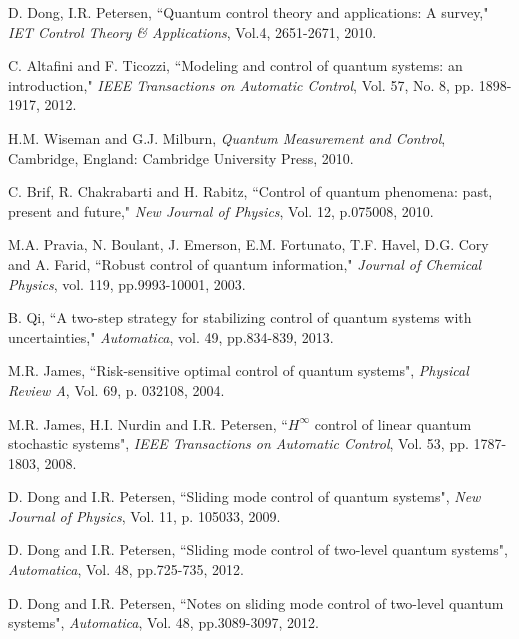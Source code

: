 \documentclass[letterpaper, 10 pt, conference]{ieeeconf}
\begin{document}
\begin{thebibliography}{99}


D. Dong, I.R. Petersen, ``Quantum control theory and
applications: A survey," {\em IET Control Theory \& Applications},
Vol.4, 2651-2671, 2010.

C. Altafini and F. Ticozzi, ``Modeling and control of quantum
systems: an introduction," {\em IEEE Transactions on Automatic
Control}, Vol. 57, No. 8, pp. 1898-1917, 2012.

H.M. Wiseman and G.J. Milburn, {\em Quantum Measurement and
Control}, Cambridge, England: Cambridge University Press, 2010.

C. Brif, R. Chakrabarti and H. Rabitz, ``Control of quantum
phenomena: past, present and future," {\em New Journal of Physics},
Vol. 12, p.075008, 2010.








M.A. Pravia, N. Boulant, J. Emerson, E.M. Fortunato, T.F. Havel,
D.G. Cory and A. Farid, ``Robust control of quantum information,"
{\em Journal of Chemical Physics}, vol. 119, pp.9993-10001, 2003.

B. Qi, ``A two-step strategy for stabilizing control of quantum systems with uncertainties,"
{\em Automatica}, vol. 49, pp.834-839, 2013.

M.R. James, ``Risk-sensitive optimal control of quantum systems",
\emph{Physical Review A}, Vol. 69, p. 032108, 2004.

M.R. James, H.I. Nurdin and I.R. Petersen, ``$H^\infty$ control of
linear quantum stochastic systems", \emph{IEEE Transactions on
Automatic Control}, Vol. 53, pp. 1787-1803, 2008.

D. Dong and I.R. Petersen, ``Sliding mode control of quantum
systems", \emph{New Journal of Physics}, Vol. 11, p. 105033, 2009.

D. Dong and I.R. Petersen, ``Sliding mode control of two-level
quantum systems", \emph{Automatica}, Vol. 48, pp.725-735, 2012.

D. Dong and I.R. Petersen, ``Notes on sliding mode control of two-level
quantum systems", \emph{Automatica}, Vol. 48, pp.3089-3097, 2012.


\end{thebibliography}
\end{document}
